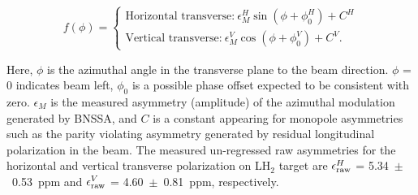 \begin{equation} \label{equ:eqFitTransverse}
f(\phi) = \left\lbrace 
\begin{aligned}
\text{Horizontal transverse:}~\epsilon_{M}^{H} \sin(\phi + \phi_{0}^{H}) + C^{H}\\
\text{Vertical transverse:}~\epsilon_{M}^{V} \cos(\phi + \phi_{0}^{V}) + C^{V}.
\end{aligned}
\right.
\end{equation}

Here, $\phi$ is the azimuthal angle in the transverse plane to the beam direction. $\phi$ = 0 indicates beam left, $\phi_{0}$ is a possible phase offset expected to be consistent with zero. $\epsilon_{M}$ is the measured asymmetry (amplitude) of the azimuthal modulation generated by BNSSA, and $C$ is a constant appearing for monopole asymmetries such as the parity violating asymmetry generated by residual longitudinal polarization in the beam. The measured un-regressed raw asymmetries for the horizontal and vertical transverse polarization on LH$_{2}$ target are $\epsilon_{\rm raw}^{H}$ = 5.34~$\pm$~0.53~ppm and $\epsilon_{\rm raw}^{V}$ = 4.60~$\pm$~0.81~ppm, respectively. 



